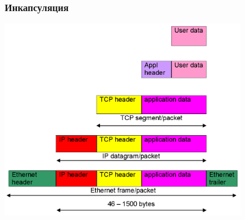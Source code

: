 \documentclass[utf8]{beamer}
\begin{document}
\begin{frame}
 \frametitle{Инкапсуляция}
\includegraphics[width=0.8\textwidth]{pic/Encapsulation.png}
\end{frame}
\end{document}
